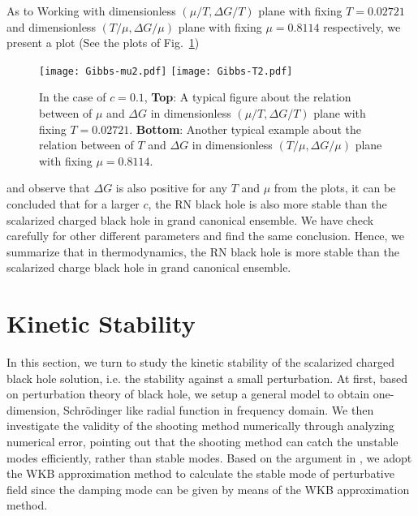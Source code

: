\documentclass[pr, twocolumn, preprintnumbers, showpacs,footnoteadded, superscriptaddress,nofootinbib,longbibliography]{revtex4-1}
\begin{document}
As to Working with dimensionless $(\mu/T, \Delta G/T)$ plane with fixing $T=0.02721$ and dimensionless $(T/\mu, \Delta G/\mu)$ plane with fixing $\mu=0.8114$ respectively, we present a plot (See the plots of Fig.~\ref{GTmu2})
%
\begin{figure}[htpb]
  \centering
  \texttt{[image: Gibbs-mu2.pdf]}
  \texttt{[image: Gibbs-T2.pdf]}
 \caption{In the case of  $c=0.1$, \textbf{Top}: A typical figure about the relation between of $\mu$ and $\Delta G$ in dimensionless $(\mu/T, \Delta G/T)$ plane with fixing $T=0.02721$.  \textbf{Bottom}:  Another typical example about the relation between of $T$ and $\Delta G$ in dimensionless $(T/\mu, \Delta G/\mu)$ plane with fixing $\mu=0.8114$.}\label{GTmu2}
\end{figure}
%
and observe that $\Delta G$ is also positive for any $T$ and $\mu$ from the plots, it can be concluded that for a larger $c$, the RN black hole is also more stable than the scalarized charged black hole in grand canonical ensemble. We have check carefully for other different parameters and find the same conclusion. Hence, we summarize that in thermodynamics, the RN black hole is more stable than the scalarized charge black hole in grand canonical ensemble.


\section{Kinetic Stability}\label{KietSta}
In this section, we turn to study the kinetic stability of the scalarized charged black hole solution, i.e. the stability against a small perturbation. At first, based on perturbation theory of black hole, we setup a general model to obtain one-dimension, Schr\"{o}dinger like radial function in frequency domain. We then investigate the validity of the shooting method numerically through analyzing numerical error, pointing out that the shooting method can catch the unstable modes efficiently, rather than stable modes. Based on the argument in \cite{Konoplya:2019hlu}, we adopt the WKB approximation method to calculate the stable mode of perturbative field since the damping mode can be given by means of the WKB approximation method.
\end{document}

